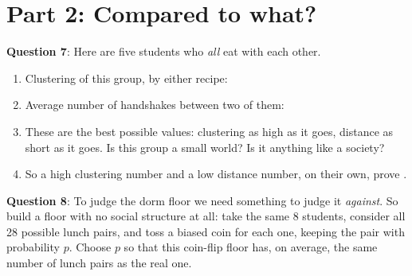 \documentclass[a4paper, 14pt]{extarticle}
\begin{document}
\clearpage

\section*{Part 2: Compared to what?}

{\bf Question 7}:
Here are five students who \emph{all} eat with each other.

\begin{center}
\end{center}

\begin{enumerate}
    \item Clustering of this group, by either recipe: \underline{\hspace{2cm}}
    \item Average number of handshakes between two of them:
          \underline{\hspace{2cm}}
    \item These are the best possible values: clustering as high as it goes,
          distance as short as it goes. Is this group a small world? Is it
          anything like a society?

    \underline{\hspace{\textwidth}}

    \item So a high clustering number and a low distance number, on their own,
          prove \underline{\hspace{5cm}}.
\end{enumerate}

\vspace{1em}

{\bf Question 8}:
To judge the dorm floor we need something to judge it \emph{against}. So build
a floor with no social structure at all: take the same 8 students, consider all
28 possible lunch pairs, and toss a biased coin for each one, keeping the pair
with probability $p$. Choose $p$ so that this coin-flip floor has, on average,
the same number of lunch pairs as the real one.
\end{document}
